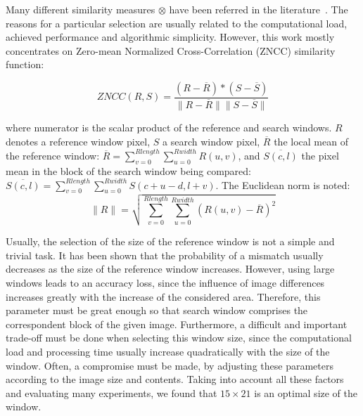 \documentclass[conference]{IEEEtran}
\begin{document}
Many different similarity measures $\otimes$ have been referred in the literature~\cite{Redert99}. The reasons for a particular selection are usually related to the computational load, achieved performance and algorithmic simplicity. However, this work mostly concentrates on Zero-mean Normalized Cross-Correlation (ZNCC) similarity function:

\begin{equation}\label{eq:zncc}
ZNCC(R,S)=\frac{\left(R-\overline{R}\right) * \left(S-\overline{S}\right)}{\|R-\overline{R}\| \|S-\overline{S}\|}
\end{equation}

\noindent where numerator is the scalar product of the reference and search windows. $R$ denotes a reference window pixel, $S$ a search window pixel, $\overline{R}$ the local mean of the reference window: $\overline{R}=\sum_{v=0}^{Rlength}\sum_{u=0}^{Rwidth}R\left(u,v\right)$, and $\overline{S\left(c,l\right)}$ the pixel mean in the block of the search window being compared: $\overline{S\left(c,l\right)}=\sum_{v=0}^{Rlength}\sum_{u=0}^{Rwidth}S\left(c+u-d,l+v\right)$. The Euclidean norm is noted:
\begin{equation}
\|R\| = \sqrt{\sum_{v=0}^{Rlength}\sum_{u=0}^{Rwidth}\left(R\left(u,v\right) - \overline{R}\right)^2}
\end{equation}

Usually, the selection of the size of the reference window is not a simple and trivial task. It has been shown that the probability of a mismatch usually decreases as the size of the reference window increases. However, using large windows leads to an accuracy loss, since the influence of image differences increases greatly with the increase of the considered area. Therefore, this parameter must be great enough so that search window comprises the correspondent block of the given image. Furthermore, a difficult and important trade-off must be done when selecting this window size, since the computational load and processing time usually increase quadratically with the size of the window. Often, a compromise must be made, by adjusting these parameters according to the image size and contents. Taking into account all these factors and evaluating many experiments, we found that $15 \times 21$ is an optimal size of the window.
\end{document}
